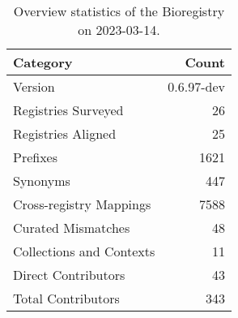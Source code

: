 \begin{table}
\centering
\caption{Overview statistics of the Bioregistry on 2023-03-14.}
\label{tab:bioregistry-summary}
\begin{tabular}{lr}
\toprule
                Category &      Count \\
\midrule
                 Version & 0.6.97-dev \\
     Registries Surveyed &         26 \\
      Registries Aligned &         25 \\
                Prefixes &       1621 \\
                Synonyms &        447 \\
 Cross-registry Mappings &       7588 \\
      Curated Mismatches &         48 \\
Collections and Contexts &         11 \\
     Direct Contributors &         43 \\
      Total Contributors &        343 \\
\bottomrule
\end{tabular}
\end{table}
